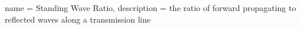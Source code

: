 {
    name = Standing Wave Ratio,
    description = {the ratio of forward propagating to reflected waves along a transmission line}
}


